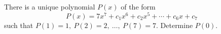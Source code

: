 There is a unique polynomial \(P(x)\) of the form
\[
P(x)=7x^7+c_1x^6+c_2x^5+\cdots+c_6x+c_7
\]
such that \(P(1)=1,\ P(2)=2,\ \dots,\ P(7)=7\). Determine \(P(0)\).
